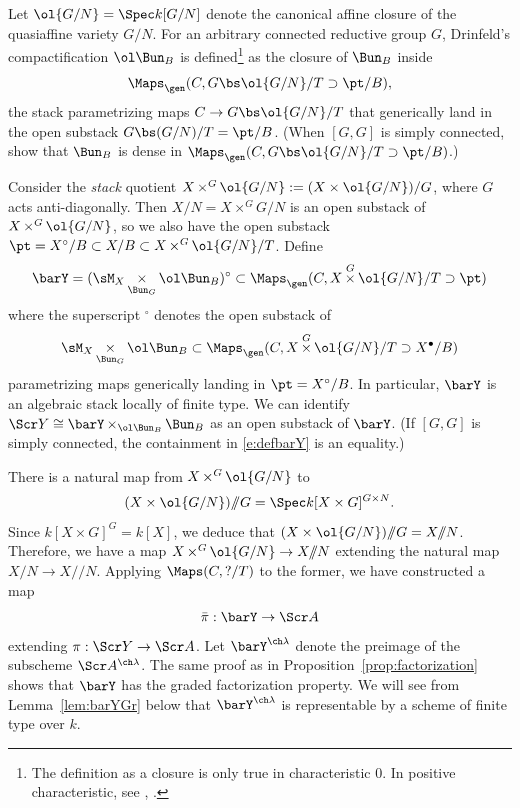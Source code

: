 \documentclass[final]{amsart}
\theoremstyle{remark}
\theoremstyle{definition}
\DeclareMathOperator*{\xt}{\times}
\numberwithin{equation}{section}
\begin{document}
Let $\ol{G/N} = \Spec k[G/N]$ denote the canonical affine closure of the 
quasiaffine variety $G/N$. 
For an arbitrary connected reductive group $G$, Drinfeld's compactification 
$\ol\Bun_B$ is defined\footnote{The definition as a closure is only true in characteristic $0$. In positive characteristic, see \cite[\S 4.1]{ABB}, \cite[\S 7.2]{Sch}.}
 as the closure of $\Bun_B$ inside 
\[ \Maps_\gen(C, G \bs \ol{G/N}/T \supset \pt/B), \] 
the stack parametrizing maps $C \to G\bs \ol{G/N}/T$ that generically land in 
the open substack $G \bs (G/N)/T = \pt/B$.
(When $[G,G]$ is simply connected, 
\cite[Proposition 1.2.3]{BG} show that $\Bun_B$ is dense in 
$\Maps_\gen(C, G\bs \ol{G/N}/T \supset \pt/B)$.) 


Consider the \emph{stack} quotient $X \xt^G \ol{G/N} := (X\times \ol{G/N})/G$, where $G$ acts 
anti-diagonally. Then $X/N = X\times^G G/N$ is an open substack of 
$X \xt^G \ol{G/N}$, so we also have the open substack 
$\pt = X^\circ/B \subset X/B \subset X \xt^G \ol{G/N}/T$. 
Define 
\begin{equation} \label{e:defbarY}
    \barY = (\sM_X \xt_{\Bun_G} \ol \Bun_B)^\circ \subset 
    \Maps_\gen( C, X \xt^G \ol{G/N}/T \supset \pt)  
\end{equation}
where the superscript $^\circ$ denotes the open substack of 
\[ \sM_X \xt_{\Bun_G} \ol \Bun_B \subset \Maps_\gen( C, X \xt^G \ol{G/N}/T \supset 
X^\bullet / B) \] 
parametrizing maps generically landing in $\pt = X^\circ/B$. 
In particular, $\barY$ is an algebraic stack locally of finite type. 
We can identify
$\Scr Y \cong \barY \xt_{\ol\Bun_B} \Bun_B$ as an open substack of $\barY$.
(If $[G,G]$ is simply connected, the containment in \eqref{e:defbarY} is an 
equality.)

There is a natural map from $X\xt^G \ol{G/N}$ to 
\[ (X \times \ol{G/N})/\!\!/G = \Spec k[X \times G]^{G \times N}. \]
Since $k[X \times G]^G = k[X]$, we deduce that $(X \times \ol{G/N})/\!\!/G = X/\!\!/N$.
Therefore, we have a map 
$X \xt^G \ol{G/N} \to X/\!\!/N$ extending the natural map $X/N \to X/\!\!/N$.
Applying $\Maps(C,?/T)$ to the former, we have constructed a map 
\begin{equation}
    \bar\pi : \barY \to \Scr A 
\end{equation}
extending $\pi : \Scr Y \to \Scr A$.
Let $\barY^{\ch\lambda}$ denote the preimage of the subscheme $\Scr A^{\ch\lambda}$. 
The same proof as in Proposition~\ref{prop:factorization} 
shows that $\barY$ has the graded factorization property. 
We will see from Lemma~\ref{lem:barYGr} below that $\barY^{\ch\lambda}$ is 
representable by a scheme of finite type over $k$.
\end{document}
